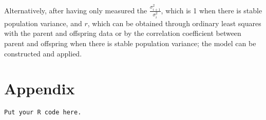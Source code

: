 \documentclass[a4paper,11pt]{article}
\begin{document}
Alternatively, after having only measured the $\frac{\sigma_{i+1}^2}{\sigma_i^2}$, which is 1 when there is stable population variance, and $r$, which can be obtained through ordinary least squares with the parent and offspring data or by the correlation coefficient between parent and offspring when there is stable population variance; the model can be constructed and applied.



\clearpage
\section*{Appendix}
\begin{verbatim}
Put your R code here.
\end{verbatim}



\end{document}
